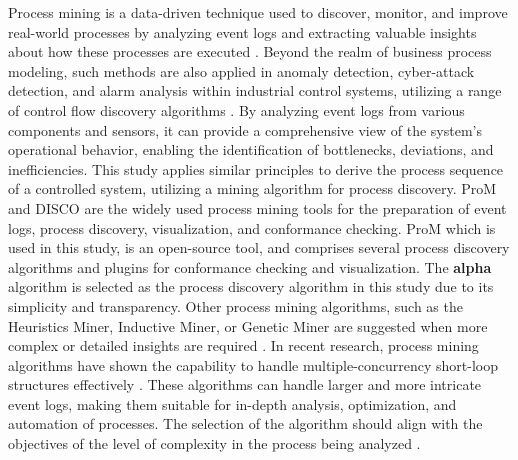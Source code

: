 \begin{bibunit}
Process mining is a data-driven technique used to discover, monitor, and improve real-world processes by analyzing event logs and extracting valuable insights about how these processes are executed \cite{agrawal1998mining, van2012process1}. Beyond the realm of business process modeling, such methods are also applied in anomaly detection, cyber-attack detection, and alarm analysis within industrial control systems, utilizing a range of control flow discovery algorithms \cite{xavier2022process}. By analyzing event logs from various components and sensors, it can provide a comprehensive view of the system's operational behavior, enabling the identification of bottlenecks, deviations, and inefficiencies. This study applies similar principles to derive the process sequence of a controlled system, utilizing a mining algorithm for process discovery. ProM \cite{van2005prom} and DISCO \cite{gunther2012disco} are the widely used process mining tools for the preparation of event logs, process discovery, visualization, and conformance checking.  ProM \cite{ProM} which is used in this study, is an open-source tool, and comprises several process discovery algorithms and plugins for conformance checking and visualization. The \textbf{alpha} algorithm \cite{petri1962} is selected as the process discovery algorithm in this study due to its simplicity and transparency. Other process mining algorithms, such as the Heuristics Miner, Inductive Miner, or Genetic Miner are suggested when more complex or detailed insights are required \cite{dunzer2019conformance, naderifar2019review}. In recent research, process mining algorithms have shown the capability to handle multiple-concurrency short-loop structures effectively \cite{sun2021algorithm,sun2021process}. These algorithms can handle larger and more intricate event logs, making them suitable for in-depth analysis, optimization, and automation of processes. The selection of the algorithm should align with the objectives of the level of complexity in the process being analyzed \cite{xavier2022process}.




\end{bibunit}
